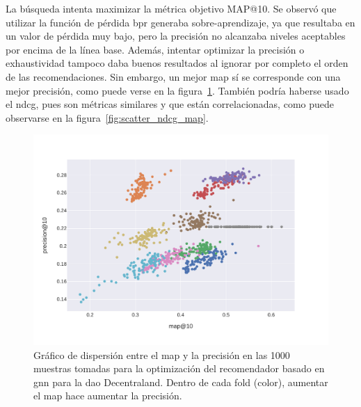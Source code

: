 La búsqueda intenta maximizar la métrica objetivo MAP@10. Se observó que utilizar la función de pérdida \gls{bpr} generaba sobre-aprendizaje, ya que resultaba en un valor de pérdida muy bajo, pero la precisión no alcanzaba niveles aceptables por encima de la línea base. Además, intentar optimizar la precisión o exhaustividad tampoco daba buenos resultados al ignorar por completo el orden de las recomendaciones. Sin embargo, un mejor \gls{map} sí se corresponde con una mejor precisión, como puede verse en la figura~\ref{fig:scatter_map_precision}. También podría haberse usado el \gls{ndcg}, pues son métricas similares y que están correlacionadas, como puede observarse en la figura~\ref{fig:scatter_ndcg_map}.

\begin{figure}[bt]
    \begin{minipage}{.48\textwidth}
        \includegraphics[width=\linewidth]{figures/04_implementacion/scatter_map_precision.pdf}
        \caption[Gráfico de dispersión entre el MAP y la precisión en las 1000 muestras tomadas del recomendador GNN para Decentraland.]{Gráfico de dispersión entre el \gls{map} y la precisión en las 1000 muestras tomadas para la optimización del recomendador basado en \gls{gnn} para la \gls{dao} Decentraland. Dentro de cada fold (color), aumentar el \gls{map} hace aumentar la precisión.}
        \label{fig:scatter_map_precision}
    \end{minipage}%
    \hfill%
    \begin{minipage}{.48\textwidth}

\end{minipage}
\end{figure}
